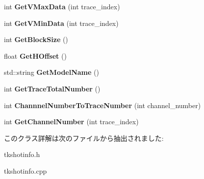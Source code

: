 \begin{DoxyCompactItemize}
int {\bfseries Get\+V\+Max\+Data} (int trace\+\_\+index)
\item 
\mbox{\label{class_t_k_d_a_t_a_aedb6a7a034ce32a02bf60b4f268febce}} 
int {\bfseries Get\+V\+Min\+Data} (int trace\+\_\+index)
\item 
\mbox{\label{class_t_k_d_a_t_a_a5fe237cba051e352845786e13c0cd54f}} 
int {\bfseries Get\+Block\+Size} ()
\item 
\mbox{\label{class_t_k_d_a_t_a_ac823854fcfb02d7788ec491b38f4d615}} 
float {\bfseries Get\+H\+Offset} ()
\item 
\mbox{\label{class_t_k_d_a_t_a_af0a676448ec4d492290517a7e60a2de3}} 
std\+::string {\bfseries Get\+Model\+Name} ()
\item 
\mbox{\label{class_t_k_d_a_t_a_a0e9270376ed47917048fdd38f2f4a81d}} 
int {\bfseries Get\+Trace\+Total\+Number} ()
\item 
\mbox{\label{class_t_k_d_a_t_a_a006dda4bebdcaad0a5863dae2a0ef535}} 
int {\bfseries Channnel\+Number\+To\+Trace\+Number} (int channel\+\_\+number)
\item 
\mbox{\label{class_t_k_d_a_t_a_ae797a1a3f5f0ec39105b22b980c3ec69}} 
int {\bfseries Get\+Channel\+Number} (int trace\+\_\+index)
\end{DoxyCompactItemize}


このクラス詳解は次のファイルから抽出されました\+:\begin{DoxyCompactItemize}
\item 
tkshotinfo.\+h\item 
tkshotinfo.\+cpp\end{DoxyCompactItemize}
